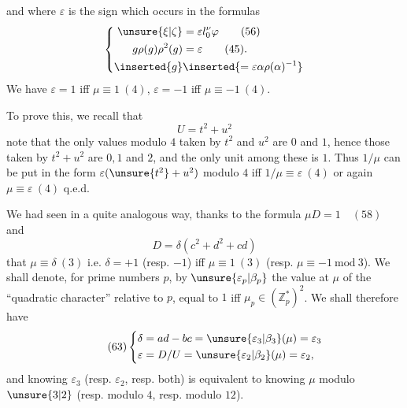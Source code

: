 and where $\varepsilon$ is the sign which occurs in the formulas
\[
\left\{\begin{aligned}
\unsure{\xi|\zeta}&=\varepsilon l_0^\nu\varphi\qquad(56)\\
g\rho(g)\rho^2(g)&=\varepsilon\qquad(45).\\
\inserted{g}&\inserted{=\varepsilon\alpha\rho(\alpha)^{-1}}
\end{aligned}\right.
\]
We have $\varepsilon=1$ iff $\mu\equiv1\ (4)$, $\varepsilon=-1$ iff $\mu\equiv-1\ (4)$.


To prove this, we recall that
\[
U=t^2+u^2
\]
note that the only values modulo $4$ taken by $t^2$ and $u^2$ are $0$ and $1$, hence those taken by $t^2+u^2$ are $0,1$ and $2$, and the only unit among these is $1$. Thus \deleted{\unsure{$\mu$}} $1/\mu$ can be put in the form $\varepsilon(\unsure{t^2}+u^2)$ modulo $4$ iff $1/\mu\equiv\varepsilon\ (4)$ or again $\mu\equiv\varepsilon\ (4)$ q.e.d.

 We had seen in a quite analogous way, thanks to the formula $\mu D=1\quad(58)$ and
\[
D=\delta(c^2+d^2+cd)
\]
that $\mu\equiv\delta\ (3)$ i.e. $\delta=+1$ (resp. $-1$) iff $\mu\equiv1\ (3)$ (resp. $\mu\equiv-1\ \mathrm{mod}\ 3$). We  shall denote, for  prime numbers $p$, by $\unsure{\varepsilon_p|\beta_p}$ the value at $\mu$ of the ``quadratic character'' relative to $p$, equal to $1$ iff $\mu_p\in(\mathbb Z_p^*)^2$. We shall therefore have
\[
\tag{63}
\left\{\begin{aligned}
\delta&=ad-bc=\unsure{\varepsilon_3|\beta_3}(\mu)=\varepsilon_3\\
\varepsilon&=D/U=\unsure{\varepsilon_2|\beta_2}(\mu)=\varepsilon_2,
\end{aligned}\right.
\]
and knowing $\varepsilon_3$ (resp. $\varepsilon_2$, resp. both) is equivalent to knowing $\mu$ modulo $\unsure{3|2}$ (resp. modulo $4$, resp. modulo $12$).

